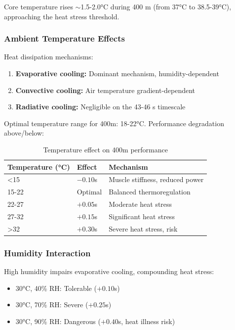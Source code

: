 Core temperature rises $\sim$1.5-2.0°C during 400 m (from 37°C to 38.5-39°C), approaching the heat stress threshold.

\subsubsection{Ambient Temperature Effects}

Heat dissipation mechanisms:
\begin{enumerate}
    \item \textbf{Evaporative cooling:} Dominant mechanism, humidity-dependent
    \item \textbf{Convective cooling:} Air temperature gradient-dependent
    \item \textbf{Radiative cooling:} Negligible on the 43-46 s timescale
\end{enumerate}

Optimal temperature range for 400m: 18-22°C. Performance degradation above/below:

\begin{table}[H]
\centering
\caption{Temperature effect on 400m performance}
\begin{tabular}{@{}lll@{}}
\toprule
\textbf{Temperature (°C)} & \textbf{Effect} & \textbf{Mechanism} \\
\midrule
<15 & $-0.10$s & Muscle stiffness, reduced power \\
15-22 & Optimal & Balanced thermoregulation \\
22-27 & $+0.05$s & Moderate heat stress \\
27-32 & $+0.15$s & Significant heat stress \\
>32 & $+0.30$s & Severe heat stress, risk \\
\bottomrule
\end{tabular}
\end{table}

\subsubsection{Humidity Interaction}

High humidity impairs evaporative cooling, compounding heat stress:
\begin{itemize}
    \item 30°C, 40\% RH: Tolerable ($+0.10$s)
    \item 30°C, 70\% RH: Severe ($+0.25$s)
    \item 30°C, 90\% RH: Dangerous ($+0.40$s, heat illness risk)
\end{itemize}

